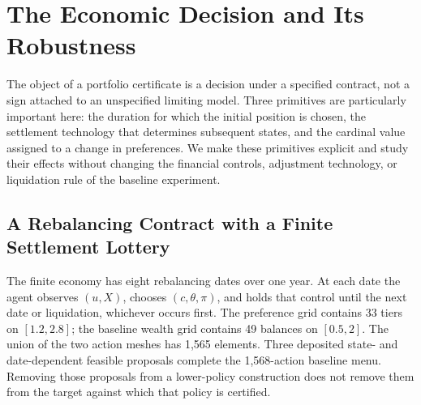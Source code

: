 \section{The Economic Decision and Its Robustness}
\label{sec:decision_target}
The object of a portfolio certificate is a decision under a specified contract, not a sign attached to an unspecified limiting model. Three primitives are particularly important here: the duration for which the initial position is chosen, the settlement technology that determines subsequent states, and the cardinal value assigned to a change in preferences. We make these primitives explicit and study their effects without changing the financial controls, adjustment technology, or liquidation rule of the baseline experiment.

\subsection{A Rebalancing Contract with a Finite Settlement Lottery}
\label{subsec:finite_protocol}
The finite economy has eight rebalancing dates over one year. At each date the agent observes $(u,X)$, chooses $(c,\theta,\pi)$, and holds that control until the next date or liquidation, whichever occurs first. The preference grid contains 33 tiers on $[1.2,2.8]$; the baseline wealth grid contains 49 balances on $[0.5,2]$. The union of the two action meshes has 1,565 elements. Three deposited state- and date-dependent feasible proposals complete the 1,568-action baseline menu. Removing those proposals from a lower-policy construction does not remove them from the target against which that policy is certified.

